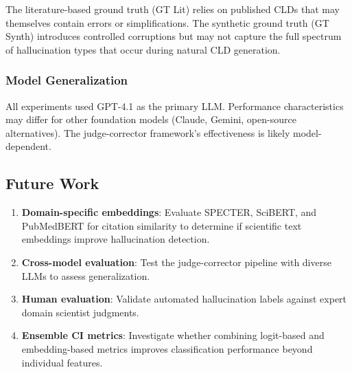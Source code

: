 The literature-based ground truth (GT Lit) relies on published CLDs that may themselves contain errors or simplifications. The synthetic ground truth (GT Synth) introduces controlled corruptions but may not capture the full spectrum of hallucination types that occur during natural CLD generation.

\subsubsection{Model Generalization}

All experiments used GPT-4.1 as the primary LLM. Performance characteristics may differ for other foundation models (Claude, Gemini, open-source alternatives). The judge-corrector framework's effectiveness is likely model-dependent.

\subsection{Future Work}

\begin{enumerate}[noitemsep]
    \item \textbf{Domain-specific embeddings}: Evaluate SPECTER, SciBERT, and PubMedBERT for citation similarity to determine if scientific text embeddings improve hallucination detection.
    \item \textbf{Cross-model evaluation}: Test the judge-corrector pipeline with diverse LLMs to assess generalization.
    \item \textbf{Human evaluation}: Validate automated hallucination labels against expert domain scientist judgments.
    \item \textbf{Ensemble CI metrics}: Investigate whether combining logit-based and embedding-based metrics improves classification performance beyond individual features.
\end{enumerate}











